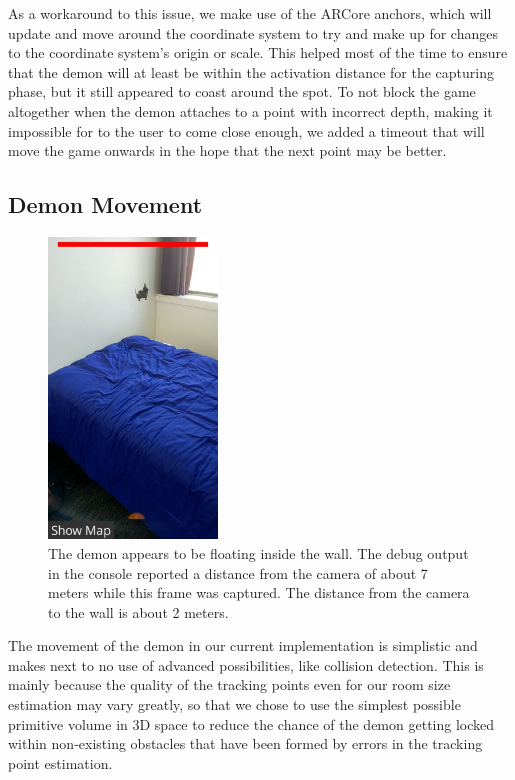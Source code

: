 As a workaround to this issue, we make use of the ARCore anchors, which will update and move around the coordinate system to try and make up for changes to the coordinate system's origin or scale.
This helped most of the time to ensure that the demon will at least be within the activation distance for the capturing phase, but it still appeared to coast around the spot.
To not block the game altogether when the demon attaches to a point with incorrect depth, making it impossible for to the user to come close enough, we added a timeout that will move the game onwards in the hope that the next point may be better.

\subsection{Demon Movement}

\begin{figure}
    \includegraphics[height=8cm]{graphics/demon-wrong-depth.jpg}
    \caption{The demon appears to be floating inside the wall. The debug output in the console reported a distance from the camera of about 7 meters while this frame was captured. The distance from the camera to the wall is about 2 meters.}
    \label{fig:demon_wrong_depth}
\end{figure}

The movement of the demon in our current implementation is simplistic and makes next to no use of advanced possibilities, like collision detection.
This is mainly because the quality of the tracking points even for our room size estimation may vary greatly, so that we chose to use the simplest possible primitive volume in 3D space to reduce the chance of the demon getting locked within non-existing obstacles that have been formed by errors in the tracking point estimation.

